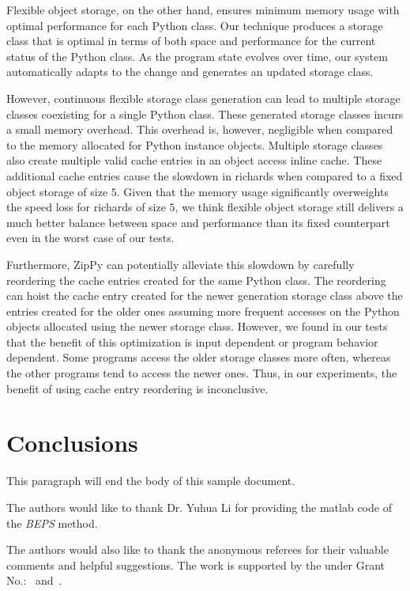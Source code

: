 Flexible object storage, on the other hand, ensures minimum memory usage with optimal performance for each Python class.
Our technique produces a storage class that is optimal in terms of both space and performance for the current status of the Python class.
As the program state evolves over time, our system automatically adapts to the change and generates an updated storage class.

However, continuous flexible storage class generation can lead to multiple storage classes coexisting for a single Python class.
These generated storage classes incurs a small memory overhead.
This overhead is, however, negligible when compared to the memory allocated for Python instance objects.
Multiple storage classes also create multiple valid cache entries in an object access inline cache.
These additional cache entries cause the slowdown in \textsf{richards} when compared to a fixed object storage of size $5$.
Given that the memory usage significantly overweights the speed loss for \textsf{richards} of size $5$, we think flexible object storage still delivers a much better balance between space and performance than its fixed counterpart even in the worst case of our tests.

Furthermore, ZipPy can potentially alleviate this slowdown by carefully reordering the cache entries created for the same Python class.
The reordering can hoist the cache entry created for the newer generation storage class above the entries created for the older ones assuming more frequent accesses on the Python objects allocated using the newer storage class.
However, we found in our tests that the benefit of this optimization is input dependent or program behavior dependent.
Some programs access the older storage classes more often, whereas the other programs tend to access the newer ones.
Thus, in our experiments, the benefit of using cache entry reordering is inconclusive.

\section{Conclusions}
This paragraph will end the body of this sample document.


\begin{acks}
  The authors would like to thank Dr. Yuhua Li for providing the
  matlab code of  the \textit{BEPS} method. 

  The authors would also like to thank the anonymous referees for
  their valuable comments and helpful suggestions. The work is
  supported by the  under Grant
  No.:~
  and~.

\end{acks}
